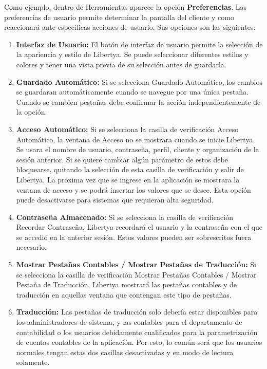 \documentclass[letterpaper,10pt,spanish]{sphinxmanual}
\begin{document}
Como ejemplo, dentro de Herramientas aparece la opción \textbf{Preferencias}. Las preferencias de usuario permite determinar la pantalla del cliente y como reaccionará ante específicas acciones de usuario. Sus opciones son las siguientes:
\begin{enumerate}
\item {} 
\textbf{Interfaz de Usuario:} El botón de interfaz de usuario permite la selección de la apariencia y estilo de Libertya. Se puede seleccionar diferentes estilos y colores y tener una vista previa de su selección antes de guardarla.

\item {} 
\textbf{Guardado Automático:} Si se selecciona Guardado Automático, los cambios se guardaran automáticamente cuando se navegue por una única pestaña. Cuando se cambien pestañas debe confirmar la acción independientemente de la opción.

\item {} 
\textbf{Acceso Automático:} Si se selecciona la casilla de verificación Acceso Automático, la ventana de Acceso no se mostrara cuando se inicie Libertya. Se usara el nombre de usuario, contraseña, perfil, cliente y organización de la sesión anterior. Si se quiere cambiar algún parámetro de estos debe bloquearse, quitando la selección de esta casilla de verificación y salir de Libertya. La próxima vez que se ingrese en la aplicación se mostrara la ventana de acceso y se podrá insertar los valores que se desee. Esta opción puede desactivarse para sistemas que requieran alta seguridad.

\item {} 
\textbf{Contraseña Almacenado:} Si se selecciona la casilla de verificación Recordar Contraseña, Libertya recordará el usuario y la contraseña con el que se accedió en la anterior sesión. Estos valores pueden ser sobrescritos fuera necesario.

\item {} 
\textbf{Mostrar Pestañas Contables / Mostrar Pestañas de Traducción:} Si se selecciona la casilla de verificación Mostrar Pestañas Contables / Mostrar Pestaña de Traducción, Libertya mostrará las pestañas contables y de traducción en aquellas ventana que contengan este tipo de pestañas.

\item {} 
\textbf{Traducción:} Las pestañas de traducción solo debería estar disponibles para los administradores de sistema, y las contables para el departamento de contabilidad o los usuarios debidamente cualificados para la parametrización de cuentas contables de la aplicación. Por esto, lo común será que los usuarios normales tengan estas dos casillas desactivadas y en modo de lectura solamente.


\end{enumerate}
\end{document}
